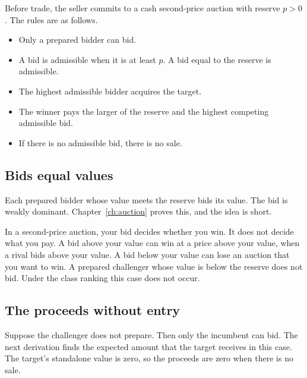 Before trade, the seller commits to a cash second-price auction with reserve \(p>0\).
The rules are as follows.
\begin{itemize}
\item Only a prepared bidder can bid.
\item A bid is admissible when it is at least \(p\). A bid equal to the reserve is admissible.
\item The highest admissible bidder acquires the target.
\item The winner pays the larger of the reserve and the highest competing admissible bid.
\item If there is no admissible bid, there is no sale.
\end{itemize}

\subsection*{Bids equal values}

Each prepared bidder whose value meets the reserve bids its value.
The bid is weakly dominant. Chapter~\ref{ch:auction} proves this, and the idea is short.

In a second-price auction, your bid decides whether you win. It does not decide what you pay.
A bid above your value can win at a price above your value, when a rival bids above your value.
A bid below your value can lose an auction that you want to win.
A prepared challenger whose value is below the reserve does not bid.
Under the class ranking this case does not occur.

\subsection*{The proceeds without entry}

Suppose the challenger does not prepare. Then only the incumbent can bid.
The next derivation finds the expected amount that the target receives in this case.
The target's standalone value is zero, so the proceeds are zero when there is no sale.

